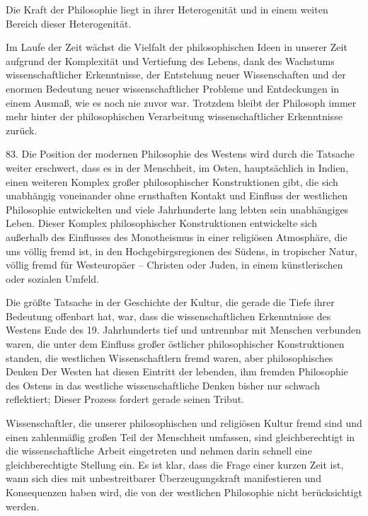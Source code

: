 \documentclass[11pt,a4paper]{book}
\begin{document}
Die Kraft der Philosophie liegt in ihrer Heterogenität und in einem weiten Bereich dieser Heterogenität.



Im Laufe der Zeit wächst die Vielfalt der philosophischen Ideen in unserer Zeit aufgrund der Komplexität und Vertiefung des Lebens, dank des Wachstums wissenschaftlicher Erkenntnisse, der Entstehung neuer Wissenschaften und der enormen Bedeutung neuer wissenschaftlicher Probleme und Entdeckungen in einem Ausmaß, wie es noch nie zuvor war. Trotzdem bleibt der Philosoph immer mehr hinter der philosophischen Verarbeitung wissenschaftlicher Erkenntnisse zurück.



83. Die Position der modernen Philosophie des Westens wird durch die Tatsache weiter erschwert, dass es in der Menschheit, im Osten, hauptsächlich in Indien, einen weiteren Komplex großer philosophischer Konstruktionen gibt, die sich unabhängig voneinander ohne ernsthaften Kontakt und Einfluss der westlichen Philosophie entwickelten und viele Jahrhunderte lang lebten sein unabhängiges Leben. Dieser Komplex philosophischer Konstruktionen entwickelte sich außerhalb des Einflusses des Monotheismus in einer religiösen Atmosphäre, die uns völlig fremd ist, in den Hochgebirgsregionen des Südens, in tropischer Natur, völlig fremd für Westeuropäer -- Christen oder Juden, in einem künstlerischen oder sozialen Umfeld.



Die größte Tatsache in der Geschichte der Kultur, die gerade die Tiefe ihrer Bedeutung offenbart hat, war, dass die wissenschaftlichen Erkenntnisse des Westens Ende des 19. Jahrhunderts tief und untrennbar mit Menschen verbunden waren, die unter dem Einfluss großer östlicher philosophischer Konstruktionen standen, die westlichen Wissenschaftlern fremd waren, aber philosophisches Denken Der Westen hat diesen Eintritt der lebenden, ihm fremden Philosophie des Ostens in das westliche wissenschaftliche Denken bisher nur schwach reflektiert; Dieser Prozess fordert gerade seinen Tribut.



Wissenschaftler, die unserer philosophischen und religiösen Kultur fremd sind und einen zahlenmäßig großen Teil der Menschheit umfassen, sind gleichberechtigt in die wissenschaftliche Arbeit eingetreten und nehmen darin schnell eine gleichberechtigte Stellung ein. Es ist klar, dass die Frage einer kurzen Zeit ist, wann sich dies mit unbestreitbarer Überzeugungskraft manifestieren und Konsequenzen haben wird, die von der westlichen Philosophie nicht berücksichtigt werden.
\end{document}
